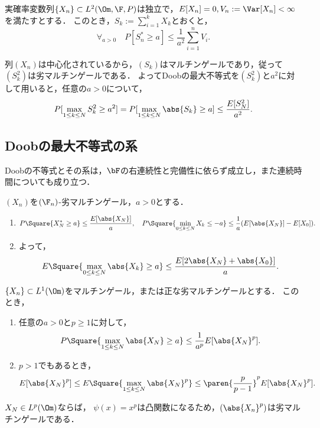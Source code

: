 \documentclass[uplatex,dvipdfmx]{jsreport}
\begin{document}
\begin{corollary}[Kolmogorov]
    実確率変数列$\{X_n\}\subset L^2(\Om,\F,P)$は独立で，$E[X_n]=0,V_n:=\Var[X_n]<\infty$を満たすとする．
    このとき，$S_k:=\sum^k_{i=1}X_k$とおくと，
    \[\forall_{a>0}\quad P[S^*_n\ge a]\le\frac{1}{a^2}\sum^n_{i=1}V_i.\]
\end{corollary}
\begin{Proof}
    列$(X_n)$は中心化されているから，$(S_k)$はマルチンゲールであり，従って$(S_k^2)$は劣マルチンゲールである．
    よってDoobの最大不等式を$(S_k^2)$と$a^2$に対して用いると，任意の$a>0$について，
    \[P[\max_{1\le k\le N}S_k^2\ge a^2]=P[\max_{1\le k\le N}\abs{S_k}\ge a]\le\frac{E[S^2_N]}{a^2}.\]
\end{Proof}

\subsection{Doobの最大不等式の系}

\begin{tcolorbox}[colframe=ForestGreen, colback=ForestGreen!10!white,breakable,colbacktitle=ForestGreen!40!white,coltitle=black,fonttitle=\bfseries\sffamily,
title=]
    Doobの不等式とその系は，$\bF$の右連続性と完備性に依らず成立し，また連続時間についても成り立つ．
\end{tcolorbox}

\begin{corollary}
    $(X_n)$を$(\F_n)$-劣マルチンゲール，$a>0$とする．
    \begin{enumerate}
        \item \[P\Square{X_N^*\ge a}\le\frac{E[\abs{X_N}]}{a},\quad P\Square{\min_{0\le k\le N}X_k\le -a}\le\frac{1}{a}(E[\abs{X_N}]-E[X_0]).\]
        \item よって，\[E\Square{\max_{0\le k\le N}\abs{X_k}\ge a}\le\frac{E[2\abs{X_N}+\abs{X_0}]}{a}.\]
    \end{enumerate}
\end{corollary}

\begin{corollary}
    $\{X_n\}\subset L^1(\Om)$をマルチンゲール，または正な劣マルチンゲールとする．
    このとき，
    \begin{enumerate}
        \item 任意の$a>0$と$p\ge1$に対して，
        \[P\Square{\max_{1\le k\le N}\abs{X_N}\ge a}\le\frac{1}{a^p}E[\abs{X_N}^p].\]
        \item $p>1$でもあるとき，
        \[E[\abs{X_N}^p]\le E\Square{\max_{1\le k\le N}\abs{X_N}^p}\le\paren{\frac{p}{p-1}}^pE[\abs{X_N}^p].\]
    \end{enumerate}
\end{corollary}
\begin{Proof}
    $X_N\in L^p(\Om)$ならば，
    $\psi(x)=x^p$は凸関数になるため，$(\abs{X_n}^p)$は劣マルチンゲールである．
\end{Proof}
\end{document}
